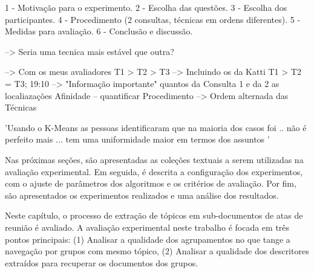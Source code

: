  1 - Motivação para o experimento.
 2 - Escolha das questões.
 3 - Escolha dos participantes.
 4 - Procedimento (2 consultas, técnicas em ordens diferentes).
 5 - Medidas para avaliação.
 6 - Conclusão e discussão.



--> Seria uma tecnica mais estável que  outra? 


--> Com os meus avaliadores T1 > T2 > T3
--> Incluindo os da Katti   T1 > T2 = T3;
19:10 --> "Informação importante"
quantos da Consulta 1 e da 2
as localiazações
Afinidade -- quantificar
Procedimento --> Ordem alternada das Técnicas






'Usando o K-Means as pessoas identificaram que na maioria dos casos foi .. não é perfeito mais ... tem uma uniformidade maior em termos dos assuntos '













Nas próximas seções, são apresentadas as coleções textuais a serem utilizadas na avaliação experimental. Em seguida, é descrita a configuração dos experimentos, com o ajuste de parâmetros dos algoritmos e os critérios de avaliação. Por fim, são apresentados os experimentos realizados e uma análise dos resultados.





Neste capítulo, o processo de extração de tópicos em sub-documentos de atas de reunião é avaliado. A avaliação experimental neste trabalho é focada em três pontos principais: 
(1) Analisar a qualidade dos agrupamentos no que tange a navegação por grupos com mesmo tópico, 
(2) Analisar a qualidade dos descritores extraídos para recuperar os documentos dos grupos.











